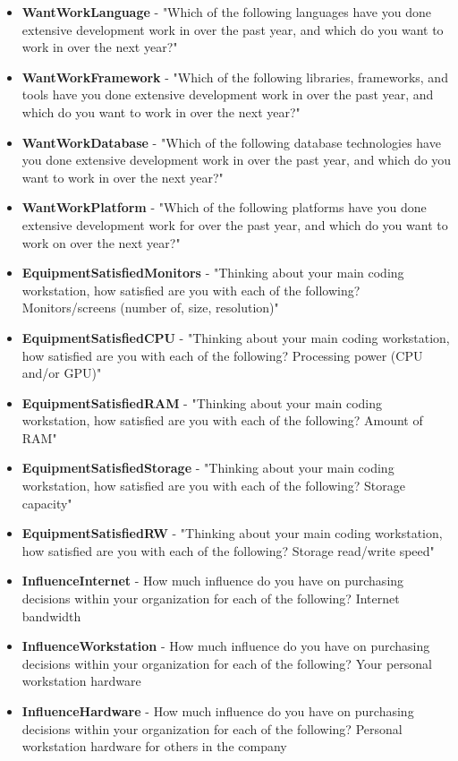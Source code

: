 \begin{appendices}
\begin{itemize}
        \item \textbf{WantWorkLanguage} - "Which of the following languages have you done extensive development work in over the past year, and which do you want to work in over the next year?"
        \item \textbf{WantWorkFramework} - "Which of the following libraries, frameworks, and tools have you done extensive development work in over the past year, and which do you want to work in over the next year?"
        \item \textbf{WantWorkDatabase} - "Which of the following database technologies have you done extensive development work in over the past year, and which do you want to work in over the next year?"
        \item \textbf{WantWorkPlatform} - "Which of the following platforms have you done extensive development work for over the past year, and which do you want to work on over the next year?"
        \item \textbf{EquipmentSatisfiedMonitors} - "Thinking about your main coding workstation, how satisfied are you with each of the following? Monitors/screens (number of, size, resolution)"
        \item \textbf{EquipmentSatisfiedCPU} - "Thinking about your main coding workstation, how satisfied are you with each of the following? Processing power (CPU and/or GPU)"
        \item \textbf{EquipmentSatisfiedRAM} - "Thinking about your main coding workstation, how satisfied are you with each of the following? Amount of RAM"
        \item \textbf{EquipmentSatisfiedStorage} - "Thinking about your main coding workstation, how satisfied are you with each of the following? Storage capacity"
        \item \textbf{EquipmentSatisfiedRW} - "Thinking about your main coding workstation, how satisfied are you with each of the following? Storage read/write speed"
        \item \textbf{InfluenceInternet} - How much influence do you have on purchasing decisions within your organization for each of the following? Internet bandwidth
        \item \textbf{InfluenceWorkstation} - How much influence do you have on purchasing decisions within your organization for each of the following? Your personal workstation hardware
        \item \textbf{InfluenceHardware} - How much influence do you have on purchasing decisions within your organization for each of the following? Personal workstation hardware for others in the company

\end{itemize}
\end{appendices}

